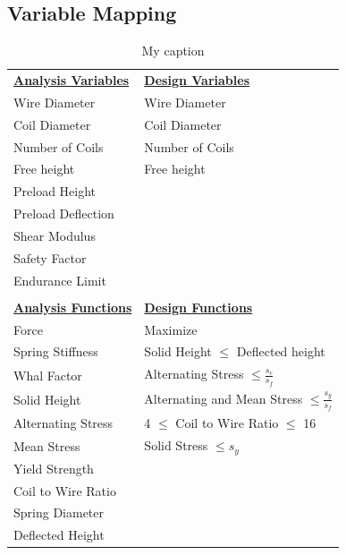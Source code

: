 \documentclass{article}
\begin{document}
\subsection{Variable Mapping}
\begin{table}[H]
\centering
\caption{My caption}
\label{my-label}
\begin{tabular}{l@{\hskip 2in}l}
\underline{\textbf{Analysis Variables}} & \underline{\textbf{Design Variables}}                             \\
Wire Diameter               & Wire Diameter                                           \\
Coil Diameter               & Coil Diameter                                           \\
Number of Coils             & Number of Coils                                         \\
Free height                 & Free height                                             \\
Preload Height              &                                                         \\
Preload Deflection          &                                                         \\
Shear Modulus               &                                                         \\
Safety Factor               &                                                         \\
Endurance Limit             &                                                         \\
                            &                                                         \\
\underline{\textbf{Analysis Functions}} & \underline{\textbf{Design Functions}}       \\
Force                       & Maximize                                                \\
Spring Stiffness            & Solid Height $\leq$ Deflected height                    \\
Whal Factor                 & Alternating Stress $\leq \frac{s_{e}}{s_{f}}$           \\
Solid Height                & Alternating and Mean Stress $\leq \frac{s_{y}}{s_{f}}$  \\
Alternating Stress          & 4 $\leq$ Coil to Wire Ratio $\leq$ 16                   \\
Mean Stress                 & Solid Stress $\leq s_{y}$                               \\
Yield Strength              &                                                         \\
Coil to Wire Ratio          &                                                         \\
Spring Diameter             &                                                         \\
Deflected Height            &                                                        
\end{tabular}
\end{table}
\end{document}
